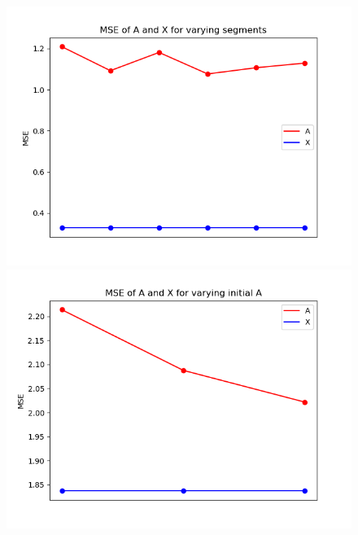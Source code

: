 \begin{figure}[H]
\begin{minipage}[t]{.45\textwidth}
    \end{minipage}
    \begin{minipage}[t]{.45\textwidth}
        \centering
		\includegraphics[scale=0.5]{figures/chapter6/Mix_Error_vary_covseg_m8_k16_L1000_RealA.png}
    \end{minipage} 
    \hfill
    \begin{minipage}[t]{.45\textwidth}
        \centering
		\includegraphics[scale=0.5]{figures/chapter6/AR_Error_initial_A_m8_k16_L1000_RealA.png}
    \end{minipage}
\caption{}
\label{fig:seg}
\end{figure}
\noindent



